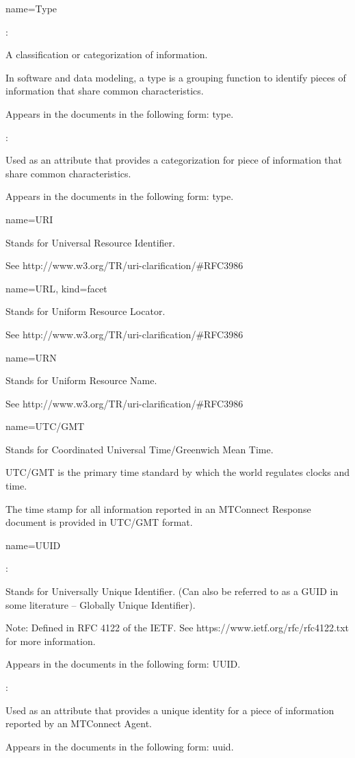 {
  name={Type}
}
{
	:

	A classification or categorization of information.

	In software and data modeling, a type is a grouping function to identify pieces of information that share common characteristics. 

	Appears in the documents in the following form: type.

	:

	Used as an attribute that provides a categorization for piece of information that share common characteristics.

	Appears in the documents in the following form: type.
}


{
  name={URI}
}
{
	Stands for Universal Resource Identifier.  

	See http://www.w3.org/TR/uri-clarification/\#RFC3986  
}


{
  name={URL},
  kind={facet}
}
{
	Stands for Uniform Resource Locator.  

	See http://www.w3.org/TR/uri-clarification/\#RFC3986
}


{
  name={URN}
}
{
	Stands for Uniform Resource Name.  

	See http://www.w3.org/TR/uri-clarification/\#RFC3986  
}


{
  name={UTC/GMT}
}
{
	Stands for Coordinated Universal Time/Greenwich Mean Time.  

	UTC/GMT is the primary time standard by which the world regulates clocks and time.

	The time stamp for all information reported in an MTConnect Response document is provided in UTC/GMT format.
}


{
  name={UUID}
}
{
	:

	Stands for Universally Unique Identifier. (Can also be referred to as a GUID in some literature – Globally Unique Identifier).

	Note:  Defined in RFC 4122 of the IETF.  See https://www.ietf.org/rfc/rfc4122.txt for more information.

	Appears in the documents in the following form: UUID.

	:

	Used as an attribute that provides a unique identity for a piece of information reported by an MTConnect Agent.

	Appears in the documents in the following form: uuid.
}


